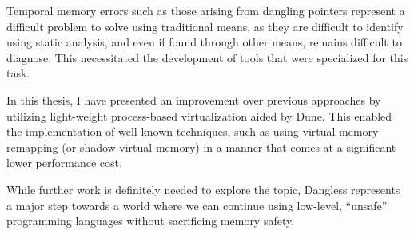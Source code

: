 Temporal memory errors such as those arising from dangling pointers represent a difficult problem to solve using traditional means, as they are difficult to identify using static analysis, and even if found through other means, remains difficult to diagnose. This necessitated the development of tools that were specialized for this task.

In this thesis, I have presented an improvement over previous approaches by utilizing light-weight process-based virtualization aided by Dune. This enabled the implementation of well-known techniques, such as using virtual memory remapping (or shadow virtual memory) in a manner that comes at a significant lower performance cost.

While further work is definitely needed to explore the topic, Dangless represents a major step towards a world where we can continue using low-level, ``unsafe'' programming languages without sacrificing memory safety.
